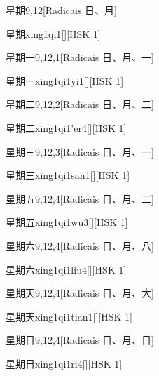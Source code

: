 \begin{entry}{星期}{9,12}[Radicais ⽇、⽉]
  \begin{phonetics}{星期}{xing1qi1}[][HSK 1]
  \end{phonetics}
\end{entry}

\begin{entry}{星期一}{9,12,1}[Radicais ⽇、⽉、⼀]
  \begin{phonetics}{星期一}{xing1qi1yi1}[][HSK 1]
  \end{phonetics}
\end{entry}

\begin{entry}{星期二}{9,12,2}[Radicais ⽇、⽉、⼆]
  \begin{phonetics}{星期二}{xing1qi1'er4}[][HSK 1]
  \end{phonetics}
\end{entry}

\begin{entry}{星期三}{9,12,3}[Radicais ⽇、⽉、⼀]
  \begin{phonetics}{星期三}{xing1qi1san1}[][HSK 1]
  \end{phonetics}
\end{entry}

\begin{entry}{星期五}{9,12,4}[Radicais ⽇、⽉、⼆]
  \begin{phonetics}{星期五}{xing1qi1wu3}[][HSK 1]
  \end{phonetics}
\end{entry}

\begin{entry}{星期六}{9,12,4}[Radicais ⽇、⽉、⼋]
  \begin{phonetics}{星期六}{xing1qi1liu4}[][HSK 1]
  \end{phonetics}
\end{entry}

\begin{entry}{星期天}{9,12,4}[Radicais ⽇、⽉、⼤]
  \begin{phonetics}{星期天}{xing1qi1tian1}[][HSK 1]
  \end{phonetics}
\end{entry}

\begin{entry}{星期日}{9,12,4}[Radicais ⽇、⽉、⽇]
  \begin{phonetics}{星期日}{xing1qi1ri4}[][HSK 1]
  \end{phonetics}
\end{entry}

